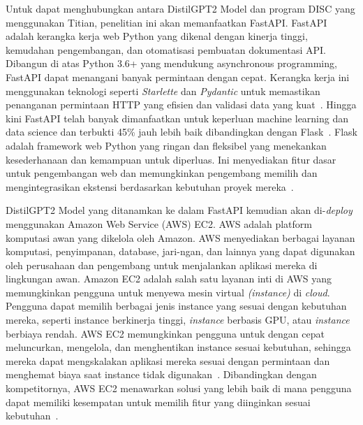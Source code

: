 Untuk dapat menghubungkan antara DistilGPT2 Model dan program DISC 
yang menggunakan Titian, penelitian ini akan memanfaatkan FastAPI. 
FastAPI adalah kerangka kerja web Python yang dikenal dengan kinerja 
tinggi, kemudahan pengembangan, dan otomatisasi pembuatan dokumentasi 
API. Dibangun di atas Python 3.6+ yang mendukung asynchronous 
programming, FastAPI dapat menangani banyak permintaan dengan 
cepat. Kerangka kerja ini menggunakan teknologi seperti 
\emph{Starlette} dan \emph{Pydantic} untuk memastikan 
penanganan permintaan HTTP yang efisien dan validasi data 
yang kuat~\cite{fastapi}. Hingga kini FastAPI telah banyak 
dimanfaatkan untuk keperluan machine learning dan data science 
dan terbukti 45\% jauh lebih baik dibandingkan dengan 
Flask~\cite{bansal2022}. Flask adalah framework web Python 
yang ringan dan fleksibel yang menekankan kesederhanaan dan 
kemampuan untuk diperluas. Ini menyediakan fitur dasar untuk 
pengembangan web dan memungkinkan pengembang memilih dan 
mengintegrasikan ekstensi berdasarkan kebutuhan 
proyek mereka~\cite{kotha2023}.

DistilGPT2 Model yang ditanamkan ke dalam FastAPI kemudian 
akan di-\emph{deploy} menggunakan Amazon Web Service (AWS) EC2. 
AWS adalah platform komputasi awan yang dikelola oleh Amazon. 
AWS menyediakan berbagai layanan komputasi, penyimpanan, database, 
jari-ngan, dan lainnya yang dapat digunakan oleh perusahaan dan 
pengembang untuk menjalankan aplikasi mereka di lingkungan awan. 
Amazon EC2 adalah salah satu layanan inti di AWS yang memungkinkan 
pengguna untuk menyewa mesin virtual \emph{(instance)} di \emph{cloud}. 
Pengguna dapat memilih berbagai jenis instance yang sesuai dengan 
kebutuhan mereka, seperti instance berkinerja tinggi, \emph{instance} 
berbasis GPU, atau \emph{instance} berbiaya rendah. AWS EC2 
memungkinkan pengguna untuk dengan cepat meluncurkan, mengelola, 
dan menghentikan instance sesuai kebutuhan, sehingga mereka dapat 
mengskalakan aplikasi mereka sesuai dengan permintaan dan menghemat 
biaya saat instance tidak digunakan~\cite{vohra2016}. Dibandingkan 
dengan kompetitornya, AWS EC2 menawarkan solusi yang lebih baik di 
mana pengguna dapat memiliki kesempatan untuk memilih fitur yang 
diinginkan sesuai kebutuhan~\cite{kumar2021}.

